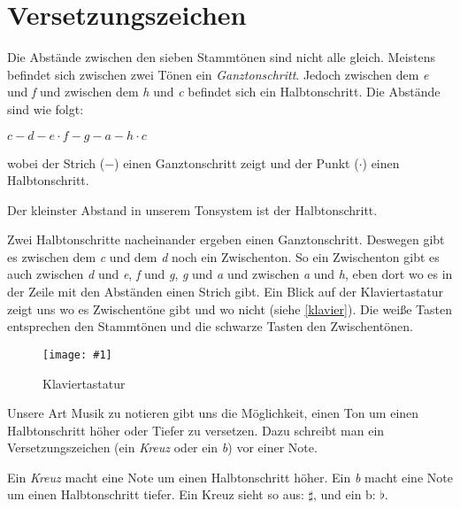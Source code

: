 \documentclass[10pt,a4paper,twoside]{report}
\newcommand{\comment}[1]{
	\marginpar{
		\textsf{#1}
	}
}
\newcommand{\image}[4]{
	\begin{figure}[!ht]
		\centering
		\texttt{[image: \#1]}
		\caption{#2}
		\label{#3}
	\end{figure}
}
\begin{document}
\section{Versetzungszeichen}
Die Abstände zwischen den sieben Stammtönen sind nicht alle gleich. 
Meistens befindet sich zwischen
zwei Tönen ein \emph{Ganztonschritt}. Jedoch zwischen dem \emph{e} und 
\emph{f} und zwischen dem \emph{h} und
\emph{c} befindet sich ein Halbtonschritt. Die Abstände sind wie folgt:
\label{tonabstände}
\begin{center}
     \emph{$ c  -  d  -  e \cdot f  -  g  -  a  -  h \cdot c $}
\end{center}
wobei der Strich ($-$) einen Ganztonschritt zeigt und der Punkt 
($\cdot$) einen Halbtonschritt.

Der kleinster Abstand in unserem Tonsystem ist der Halbtonschritt.
\comment{Halbtonschritt\\Ganztonschritt} Zwei Halbtonschritte nacheinander 
ergeben einen Ganztonschritt. Deswegen gibt es zwischen dem 
\emph{c} und dem \emph{d} noch ein
Zwischenton. So ein Zwischenton gibt es auch zwischen
\emph{d} und \emph{e}, \emph{f} und \emph{g},
\emph{g} und \emph{a} und zwischen \emph{a} und \emph{h}, 
eben dort wo es in der Zeile mit den Abständen
einen Strich gibt. Ein Blick auf der Klaviertastatur 
zeigt uns wo es Zwischentöne gibt und wo nicht 
(siehe \autoref{klavier}). Die weiße Tasten entsprechen 
den Stammtönen und die schwarze Tasten den 
Zwischentönen.
\image{klavier.jpg}{Klaviertastatur}{klavier}{5}

Unsere Art Musik zu notieren gibt uns die Möglichkeit, 
einen Ton um einen Halbtonschritt 
höher oder Tiefer zu versetzen. Dazu schreibt man ein Versetzungszeichen 
(ein \emph{Kreuz} oder ein \emph{b}) vor einer Note.
\comment{Kreuz: $\sharp$\\b: $\flat$}
Ein \emph{Kreuz} macht eine Note um einen Halbtonschritt höher. 
Ein \emph{b} macht eine 
Note um einen Halbtonschritt tiefer. Ein Kreuz sieht so 
aus: $\sharp$, und ein b: $\flat$.
\end{document}
